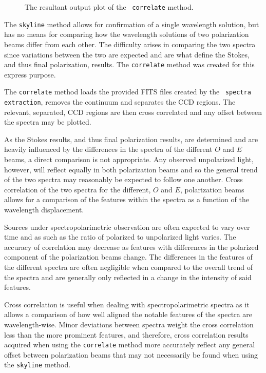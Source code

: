 \begin{figure}[t]
    \centering
    \caption{The resultant output plot of the \stops\ \texttt{correlate} method.}
    \label{fig:stops_corr_eg}
\end{figure}

The \texttt{skyline} method allows for confirmation of a single wavelength solution, but has no means for comparing how the wavelength solutions of two polarization beams differ from each other. The difficulty arises in comparing the two spectra since variations between the two are expected and are what define the Stokes, and thus final polarization, results. The \texttt{correlate} method was created for this express purpose.

The \texttt{correlate} method loads the provided \gls{FITS} files created by the \polsalt\ \texttt{spectra extraction}, removes the continuum and separates the \gls{CCD} regions. The relevant, separated, \gls{CCD} regions are then cross correlated and any offset between the spectra may be plotted.

As the Stokes results, and thus final polarization results, are determined and are heavily influenced by the differences in the spectra of the different $O$ and $E$ beams, a direct comparison is not appropriate. Any observed unpolarized light, however, will reflect equally in both polarization beams and so the general trend of the two spectra may reasonably be expected to follow one another. Cross correlation of the two spectra for the different, $O$ and $E$, polarization beams allows for a comparison of the features within the spectra as a function of the wavelength displacement.

Sources under spectropolarimetric observation are often expected to vary over time and as such as the ratio of polarized to unpolarized light varies. The accuracy of correlation may decrease as features with differences in the polarized component of the polarization beams change. The differences in the features of the different spectra are often negligible when compared to the overall trend of the spectra and are generally only reflected in a change in the intensity of said features.

Cross correlation is useful when dealing with spectropolarimetric spectra as it allows a comparison of how well aligned the notable features of the spectra are wavelength-wise. Minor deviations between spectra weight the cross correlation less than the more prominent features, and therefore, cross correlation results acquired when using the \texttt{correlate} method more accurately reflect any general offset between polarization beams that may not necessarily be found when using the \texttt{skyline} method.

